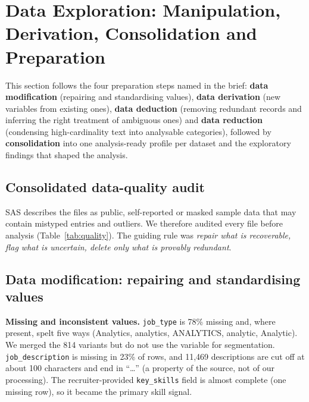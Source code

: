\section{Data Exploration: Manipulation, Derivation, Consolidation and Preparation}\label{sec:data}

This section follows the four preparation steps named in the brief: \textbf{data modification}
(repairing and standardising values), \textbf{data derivation} (new variables from existing ones),
\textbf{data deduction} (removing redundant records and inferring the right treatment of ambiguous
ones) and \textbf{data reduction} (condensing high-cardinality text into analysable categories),
followed by \textbf{consolidation} into one analysis-ready profile per dataset and the exploratory
findings that shaped the analysis.

\subsection{Consolidated data-quality audit}

SAS describes the files as public, self-reported or masked sample data that may contain mistyped
entries and outliers. We therefore audited every file before analysis (Table~\ref{tab:quality}).
The guiding rule was \emph{repair what is recoverable, flag what is uncertain, delete only what is
provably redundant}.

\begin{table}[H]\centering\scriptsize
\caption{Data-quality audit and actions for the four SAS files.}\label{tab:quality}

\end{table}

\subsection{Data modification: repairing and standardising values}

\textbf{Missing and inconsistent values.} \texttt{job\_type} is 78\% missing and, where present,
spelt five ways (Analytics, analytics, ANALYTICS, analytic, Analytic). We merged the 814 variants
but do not use the variable for segmentation. \texttt{job\_description} is missing in 23\% of rows,
and 11,469 descriptions are cut off at about 100 characters and end in ``\ldots'' (a property of the
source, not of our processing). The recruiter-provided \texttt{key\_skills} field is almost complete
(one missing row), so it became the primary skill signal.

